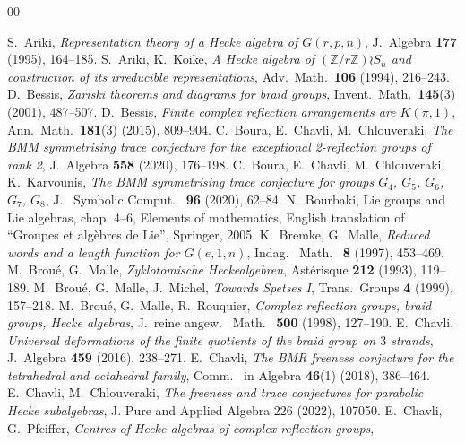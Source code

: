 \documentclass[11pt, reqno]{amsart}
\numberwithin{equation}{section}
\theoremstyle{remark}
\begin{document}
\begin{thebibliography}{00}
	
	
	 S.~Ariki, \emph{Representation theory of a Hecke algebra of 
		$G(r, p, n)$}, J.~Algebra {\bf 177} (1995), 164--185.
	 S.~Ariki, K.~Koike, {\em A Hecke algebra of $(\mathbb{Z}/r\mathbb{Z})\wr S_n$ and construction of its irreducible representations}, Adv.~Math.~\textbf{106} (1994), 216--243.
	 D.~Bessis, \emph{Zariski theorems and diagrams for braid groups}, Invent.~Math.~{\bf 145}(3) (2001), 487--507.
	 D.~Bessis, \emph{Finite complex reflection arrangements are $K(\pi, 1)$}, Ann.~Math.~{\bf 181}(3) (2015), 809--904.
	 C.~Boura, E.~Chavli, M.~Chlouveraki,  \emph{The BMM symmetrising trace conjecture for the exceptional 2-reflection groups of rank 2}, J.~Algebra {\bf 558} (2020), 176--198.
	 C.~Boura, E.~Chavli, M.~Chlouveraki, K.~Karvounis,  \emph{The BMM symmetrising trace conjecture for groups $G_4$, $G_5$, $G_6$, $G_7$, $G_8$}, J.~ Symbolic Comput.~ {\bf 96} (2020), 62--84.
	 N.~Bourbaki, Lie groups and Lie algebras, chap. 4--6, Elements of mathematics, English translation of ``Groupes et alg\`ebres de Lie'', Springer, 2005.
	 K.~Bremke, G.~Malle, \emph{Reduced words and a length function for $G(e, 1, n)$}, Indag.~ Math.~ {\bf 8} (1997), 453--469.
	 M.~Brou\'e, G.~Malle, \emph{Zyklotomische Heckealgebren},  Ast\'erisque  {\bf 212}  (1993), 119--189.
	  M.~Brou{\'e}, G.~Malle, J.~Michel, \emph{Towards Spetses I}, Trans.~Groups {\bf 4} (1999), 157--218.
	 M.~Brou{\'e}, G.~Malle, R.~Rouquier, \emph{Complex 
		reflection groups, braid groups, Hecke algebras}, J.~reine angew.~
	Math.~ {\bf 500} (1998), 127--190.
	 E.~Chavli, \emph{Universal  deformations  of  the  finite  quotients  of  the  braid  group  on  $3$  strands}, J.~Algebra {\bf 459} (2016), 238--271.
	 E.~Chavli, \emph{The BMR freeness conjecture for the tetrahedral and octahedral family}, Comm.~ in Algebra {\bf 46}(1) (2018), 386--464.
	 E.~Chavli, M.~Chlouveraki,
	\emph{The freeness and trace conjectures for parabolic Hecke subalgebras},
	J. Pure and Applied Algebra 226 (2022), 107050.
	E.~Chavli, G.~Pfeiffer,
	\emph{Centres of Hecke algebras of complex reflection groups},

\end{thebibliography}
\end{document}
